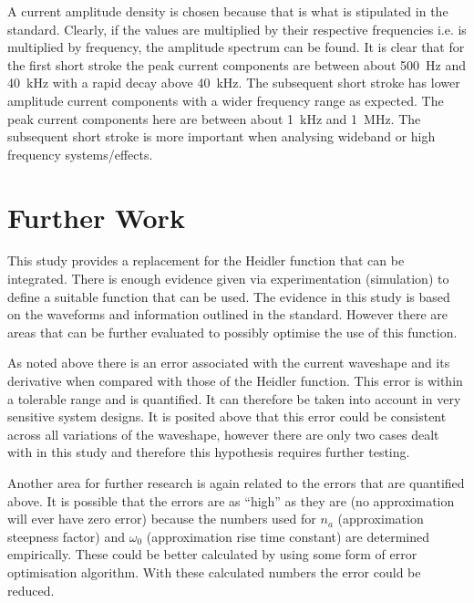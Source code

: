 A current amplitude density is chosen because that is what is stipulated in the standard. Clearly, if the values are multiplied by their respective frequencies i.e.  is multiplied by frequency, the amplitude spectrum can be found. It is clear that for the first short stroke the peak current components are between about 500~Hz and 40~kHz with a rapid decay above 40~kHz. The subsequent short stroke has lower amplitude current components with a wider frequency range as expected. The peak current components here are between about 1~kHz and 1~MHz. The subsequent short stroke is more important when analysing wideband or high frequency systems/effects.


\section{Further Work}
\label{sec:discussion_further_work}
This study provides a replacement for the Heidler function that can be integrated. There is enough evidence given via experimentation (simulation) to define a suitable function that can be used. The evidence in this study is based on the waveforms and information outlined in the standard. However there are areas that can be further evaluated to possibly optimise the use of this function.

As noted above there is an error associated with the current waveshape and its derivative when compared with those of the Heidler function. This error is within a tolerable range and is quantified. It can therefore be taken into account in very sensitive system designs. It is posited above that this error could be consistent across all variations of the waveshape, however there are only two cases dealt with in this study and therefore this hypothesis requires further testing.

Another area for further research is again related to the errors that are quantified above. It is possible that the errors are as ``high'' as they are (no approximation will ever have zero error) because the numbers used for $n_a$ (approximation steepness factor) and $\omega_0$ (approximation rise time constant) are determined empirically. These could be better calculated by using some form of error optimisation algorithm. With these calculated numbers the error could be reduced.

